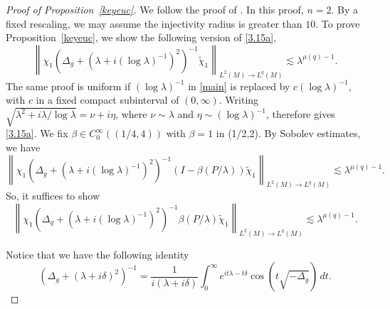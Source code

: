 \documentclass[11pt]{amsart}
\newcommand{\la}{\lambda}
\begin{document}
\begin{proof}[Proof of Proposition~\ref{keyeuc}]
We follow the proof of \cite[Proposition 2.8]{HSTZ}.
In this proof, $n=2$. By a fixed rescaling, we may assume the injectivity radius is greater than $10$. To prove Proposition~\ref{keyeuc}, we show the following version of \eqref{3.15a},
\begin{equation}\label{main}
    \left\|\chi_1\left(\Delta_g+(\la+i(\log\la)^{-1})^2\right)^{-1}\tilde\chi_1\right\|_{L^2(M)\to L^q(M)}\lesssim \la^{\mu(q)-1}.
\end{equation}
The same proof is uniform if $(\log\la)^{-1}$ in \eqref{main} is replaced by $c(\log\la)^{-1}$, with $c$ in a fixed compact subinterval of $(0,\infty)$. Writing $\sqrt{\la^2+i\la/\log\la}=\nu+i\eta$, where $\nu\sim\la$ and $\eta\sim(\log\la)^{-1}$, therefore gives \eqref{3.15a}.
We fix $\beta \in C^\infty_0((1/4,4))$ with $\beta= 1$ in (1/2,2). By Sobolev estimates, we have \begin{equation}\label{p2.5}
    \left\|\chi_1\left(\Delta_g+(\la+i(\log\la)^{-1})^2\right)^{-1}(I-\beta(P/\la))\tilde\chi_1\right\|_{L^2(M)\to L^q(M)}\lesssim \la^{\mu(q)-1}.
\end{equation} So, it suffices to show 
\begin{equation}\label{eq:res-near}
    \left\|\chi_1\left(\Delta_g+(\la+i(\log\la)^{-1})^2\right)^{-1}\beta(P/\la)\tilde\chi_1\right\|_{L^2(M)\to L^q(M)}\lesssim \la^{\mu(q)-1}.
\end{equation}

Notice that we have the following identity
\begin{equation}\label{resolvent}
    \left(\Delta_g+(\la+i\delta)^2\right)^{-1}=\frac1{i(\la+i\delta)}\int_0^\infty e^{it\la-t\delta}\cos (t\sqrt{-\Delta_g})\,dt.
\end{equation}




\end{proof}
\end{document}
